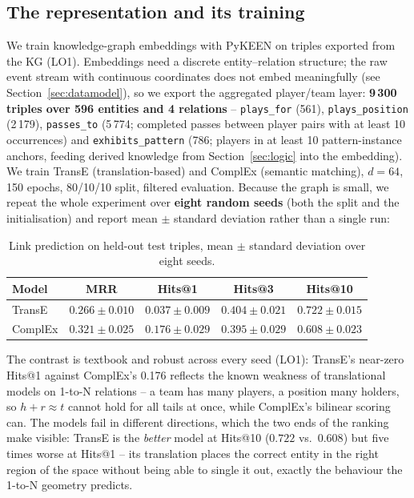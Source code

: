 \documentclass[11pt,a4paper]{article}
\begin{document}
\subsection{The representation and its training}

We train knowledge-graph embeddings with PyKEEN on triples exported from the KG
(LO1). Embeddings need a discrete entity--relation structure; the raw event
stream with continuous coordinates does not embed meaningfully (see
Section~\ref{sec:datamodel}), so we export the aggregated player/team layer:
\textbf{9\,300 triples over 596 entities and 4 relations} --
\texttt{plays\_for} (561), \texttt{plays\_position} (2\,179), \texttt{passes\_to}
(5\,774; completed passes between player pairs with at least 10 occurrences) and
\texttt{exhibits\_pattern} (786; players in at least 10 pattern-instance
anchors, feeding derived knowledge from Section~\ref{sec:logic} into the
embedding). We train TransE (translation-based) and ComplEx (semantic matching),
$d = 64$, 150 epochs, 80/10/10 split, filtered evaluation. Because the graph is
small, we repeat the whole experiment over \textbf{eight random seeds} (both the
split and the initialisation) and report mean $\pm$ standard deviation rather
than a single run:

\begin{table}[ht]
\centering
\begin{tabular}{lcccc}
\toprule
Model & MRR & Hits@1 & Hits@3 & Hits@10 \\
\midrule
TransE  & $0.266 \pm 0.010$ & $0.037 \pm 0.009$ & $0.404 \pm 0.021$ & $0.722 \pm 0.015$ \\
ComplEx & $0.321 \pm 0.025$ & $0.176 \pm 0.029$ & $0.395 \pm 0.029$ & $0.608 \pm 0.023$ \\
\bottomrule
\end{tabular}
\caption{Link prediction on held-out test triples, mean $\pm$ standard
deviation over eight seeds.}
\end{table}

The contrast is textbook and robust across every seed (LO1): TransE's near-zero
Hits@1 against ComplEx's 0.176 reflects the known weakness of translational
models on 1-to-N relations -- a team has many players, a position many holders,
so $h + r \approx t$ cannot hold for all tails at once, while ComplEx's bilinear
scoring can. The models fail in different directions, which the two ends of the
ranking make visible: TransE is the \emph{better} model at Hits@10 ($0.722$ vs.\
$0.608$) but five times worse at Hits@1 -- its translation places the correct
entity in the right region of the space without being able to single it out,
exactly the behaviour the 1-to-N geometry predicts.
\end{document}
